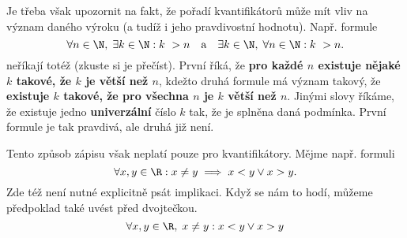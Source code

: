 Je třeba však upozornit na fakt, že pořadí kvantifikátorů může mít vliv na význam daného výroku (a tudíž i jeho pravdivostní hodnotu). Např. formule
\begin{equation*}
    \forall n\in\N,\; \exists k\in\N : k~> n\quad\text{a}\quad\exists k\in\N,\;\forall n\in\N : k~> n.
\end{equation*}
neříkají totéž (zkuste si je přečíst). První říká, že \textbf{pro každé $n$ existuje nějaké $k$ takové, že $k$ je větší než $n$}, kdežto druhá formule má význam takový, že \textbf{existuje $k$ takové, že pro všechna $n$ je $k$ větší než $n$}. Jinými slovy říkáme, že existuje jedno \textbf{univerzální} číslo $k$ tak, že je splněna daná podmínka. První formule je tak pravdivá, ale druhá již není.\par
Tento způsob zápisu však neplatí pouze pro kvantifikátory. Mějme např. formuli
\begin{equation*}
    \forall x,y\in\R: x\neq y \implies x < y \lor x > y.
\end{equation*}
Zde též není nutné explicitně psát implikaci. Když se nám to hodí, můžeme předpoklad také uvést před dvojtečkou.
\begin{equation*}
    \forall x,y\in\R,\;x\neq y: x < y \lor x > y
\end{equation*}


